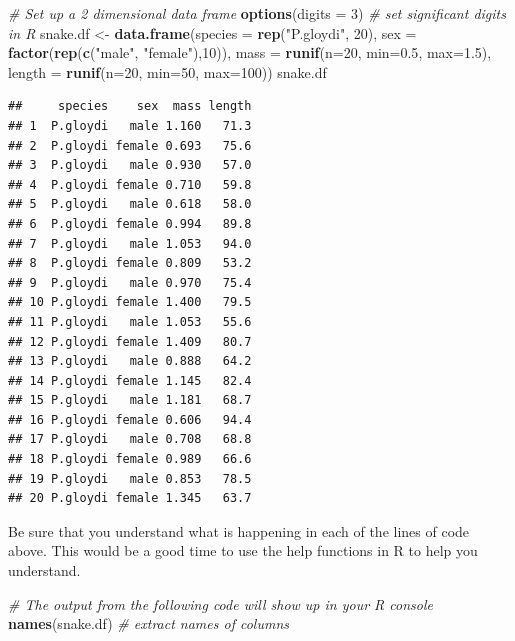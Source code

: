 \documentclass[
]{book}
\newenvironment{Shaded}{\begin{snugshade}}{\end{snugshade}}
\newcommand{\AttributeTok}[1]{\textcolor[rgb]{0.13,0.29,0.53}{#1}}
\newcommand{\CommentTok}[1]{\textcolor[rgb]{0.56,0.35,0.01}{\textit{#1}}}
\newcommand{\DecValTok}[1]{\textcolor[rgb]{0.00,0.00,0.81}{#1}}
\newcommand{\FloatTok}[1]{\textcolor[rgb]{0.00,0.00,0.81}{#1}}
\newcommand{\FunctionTok}[1]{\textcolor[rgb]{0.13,0.29,0.53}{\textbf{#1}}}
\newcommand{\NormalTok}[1]{#1}
\newcommand{\OtherTok}[1]{\textcolor[rgb]{0.56,0.35,0.01}{#1}}
\newcommand{\StringTok}[1]{\textcolor[rgb]{0.31,0.60,0.02}{#1}}
\begin{document}
\begin{Shaded}
\begin{Highlighting}[]
\CommentTok{\# Set up a 2 dimensional data frame}
\FunctionTok{options}\NormalTok{(}\AttributeTok{digits =} \DecValTok{3}\NormalTok{)  }\CommentTok{\# set significant digits in R}
\NormalTok{snake.df }\OtherTok{\textless{}{-}} \FunctionTok{data.frame}\NormalTok{(}\AttributeTok{species =} \FunctionTok{rep}\NormalTok{(}\StringTok{"P.gloydi"}\NormalTok{, }\DecValTok{20}\NormalTok{), }
                       \AttributeTok{sex =} \FunctionTok{factor}\NormalTok{(}\FunctionTok{rep}\NormalTok{(}\FunctionTok{c}\NormalTok{(}\StringTok{"male"}\NormalTok{, }\StringTok{"female"}\NormalTok{),}\DecValTok{10}\NormalTok{)),}
                       \AttributeTok{mass =} \FunctionTok{runif}\NormalTok{(}\AttributeTok{n=}\DecValTok{20}\NormalTok{, }\AttributeTok{min=}\FloatTok{0.5}\NormalTok{, }\AttributeTok{max=}\FloatTok{1.5}\NormalTok{),}
                       \AttributeTok{length =} \FunctionTok{runif}\NormalTok{(}\AttributeTok{n=}\DecValTok{20}\NormalTok{, }\AttributeTok{min=}\DecValTok{50}\NormalTok{, }\AttributeTok{max=}\DecValTok{100}\NormalTok{))}
\NormalTok{snake.df}
\end{Highlighting}
\end{Shaded}

\begin{verbatim}
##     species    sex  mass length
## 1  P.gloydi   male 1.160   71.3
## 2  P.gloydi female 0.693   75.6
## 3  P.gloydi   male 0.930   57.0
## 4  P.gloydi female 0.710   59.8
## 5  P.gloydi   male 0.618   58.0
## 6  P.gloydi female 0.994   89.8
## 7  P.gloydi   male 1.053   94.0
## 8  P.gloydi female 0.809   53.2
## 9  P.gloydi   male 0.970   75.4
## 10 P.gloydi female 1.400   79.5
## 11 P.gloydi   male 1.053   55.6
## 12 P.gloydi female 1.409   80.7
## 13 P.gloydi   male 0.888   64.2
## 14 P.gloydi female 1.145   82.4
## 15 P.gloydi   male 1.181   68.7
## 16 P.gloydi female 0.606   94.4
## 17 P.gloydi   male 0.708   68.8
## 18 P.gloydi female 0.989   66.6
## 19 P.gloydi   male 0.853   78.5
## 20 P.gloydi female 1.345   63.7
\end{verbatim}

Be sure that you understand what is happening in each of the lines of code above. This would be a good time to use the help functions in R to help you understand.

\begin{Shaded}
\begin{Highlighting}[]
\CommentTok{\# The output from the following code will show up in your R console}
\FunctionTok{names}\NormalTok{(snake.df)  }\CommentTok{\# extract names of columns}
\end{Highlighting}
\end{Shaded}
\end{document}
